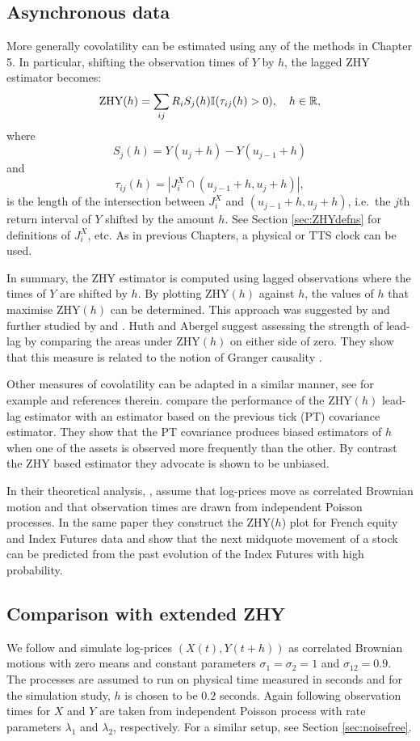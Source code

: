 %
\subsection{Asynchronous data}
More generally covolatility can be estimated using any of the methods in Chapter 5. In particular, shifting the observation times of $Y$ by $h$, the lagged ZHY estimator becomes:
$$ \text{\rm ZHY}(h) = \sum_{ij} R_i S_j(h) \mathbb{I}(\tau_{ij}(h)>0),\quad h \in \mathbb{R},$$
where 
$$S_j(h) = Y(u_j +h)- Y(u_{j-1} + h)$$ and 
$$
 \tau_{ij}(h) = |J_i^X \cap (u_{j-1} +h, u_{j} + h)|,
$$
is the length of the intersection between $J_i^X$ and $(u_{j-1} +h, u_{j} + h)$, i.e.\  the $j$th return interval of $Y$ shifted by the amount $h$. 
See Section \ref{sec:ZHYdefns} for definitions of $J_i^X$, etc.  As in previous Chapters, a physical or TTS clock can be used.

In summary, the ZHY estimator is computed using lagged observations where the times of $Y$ are shifted by $h$. By plotting ZHY$(h)$ against $h$, the values of $h$ that maximise ZHY$(h)$ can be determined.  This approach was suggested by \citet{hoffmann2013estimation} and further studied by \citet{huth2014high} and \citet{alsayed2014ultra}.  Huth and Abergel suggest assessing the strength of lead-lag by comparing the areas under ZHY$(h)$ on either side of zero.  They show that this measure is related to the notion of Granger causality \citep{granger1969investigating}. 

Other measures of covolatility can be adapted in a similar manner, see for example \citet{de1997high} and references therein. \citet{alsayed2014ultra} compare the performance of the ZHY$(h)$ lead-lag estimator with an estimator based on the previous tick (PT) covariance estimator. They show that the PT covariance produces biased estimators of $h$ when one of the assets is observed more frequently than the other. By contrast the ZHY based estimator they advocate is shown to be unbiased. 

In their theoretical analysis, \citet{huth2014high}, assume that log-prices move as correlated Brownian motion and that observation times are drawn from independent Poisson processes. In the same paper they construct the ZHY($h$) plot for French equity and Index Futures data and show that 
the next midquote movement of a stock can be predicted from the past evolution of the Index Futures with high probability.

\subsection{Comparison with extended ZHY}
We follow \citet{huth2014high} and simulate log-prices $(X(t),Y(t+h))$ as correlated Brownian motions with zero means and constant parameters $\sigma_1 = \sigma_2 = 1$ and $\sigma_{12} = 0.9$. The processes are assumed to run on physical time measured in seconds and for the simulation study, $h$ is chosen to be $0.2$ seconds.  Again following \citet{huth2014high} observation times for $X$ and $Y$ are taken from independent Poisson process with rate parameters $\lambda_1$ and $\lambda_2$, respectively.  For a similar setup, see Section \ref{sec:noisefree}.  

